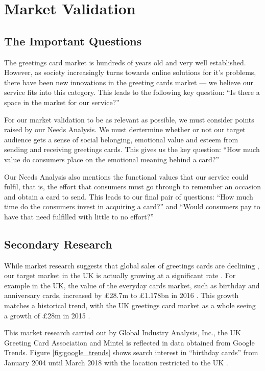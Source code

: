\documentclass[10pt, a4paper]{article}
\begin{document}
\section*{Market Validation}

\subsection*{The Important Questions}
The greetings card market is hundreds of years old and very well established. However, as society increasingly turns towards online solutions for it's problems, there have been new innovations in the greeting cards market --- we believe our service fits into this category. This leads to the following key question: “Is there a space in the market for our service?”

For our market validation to be as relevant as possible, we must consider points raised by our Needs Analysis. We must dertermine whether or not our target audience gets a sense of social belonging, emotional value and esteem from sending and receiving greetings cards. This gives us the key question: “How much value do consumers place on the emotional meaning behind a card?”

Our Needs Analysis also mentions the functional values that our service could fulfil, that is, the effort that consumers must go through to remember an occasion and obtain a card to send. This leads to our final pair of questions: “How much time do the consumers invest in acquiring a card?” and “Would consumers pay to have that need fulfilled with little to no effort?”

\subsection*{Secondary Research}
While market research suggests that global sales of greetings cards are declining \citep{strategyr}, our target market in the UK is actually growing at a significant rate \citep{greetingcardassociation}. For example in the UK, the value of the everyday cards market, such as birthday and anniversary cards, increased by £28.7m to £1.178bn in 2016 \citep{greetingcardassociation}. This growth matches a historical trend, with the UK greetings card market as a whole seeing a growth of £28m in 2015 \citep{mintel}.

This market research carried out by Global Industry Analysis, Inc., the UK Greeting Card Association and Mintel is reflected in data obtained from Google Trends. Figure \ref{fig:google_trends} shows search interest in “birthday cards” from January 2004 until March 2018 with the location restricted to the UK \citep{google_trends}.
\end{document}
